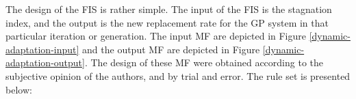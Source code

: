 \documentclass[a4paper,twoside]{article}
\begin{document}

The design of the FIS is rather simple. The input of the FIS is the
stagnation index, and the output is the new replacement rate for the GP
system in that particular iteration or generation. The input MF are
depicted in Figure \ref{dynamic-adaptation-input} and the output MF
are depicted in Figure \ref{dynamic-adaptation-output}. The design of
these MF were obtained according to the subjective opinion of the
authors, and by trial and error. The rule set is presented below: 
\end{document}
